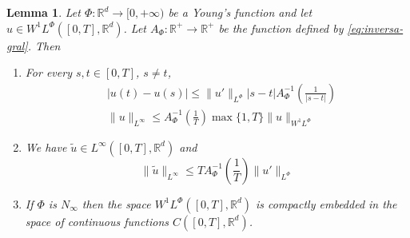 \documentclass[twoside]{article}
\newtheorem{lem}[thm]{Lemma}
\theoremstyle{remark}
\newcommand{\orlnor}{\|_{L^{\Phi}}}
\newcommand{\linf}{\|_{L^{\infty}}}
\newcommand{\lphi}{L^{\Phi}}
\newcommand{\wphi}{W^{1}\lphi}
\newcommand{\sobnor}{\|_{W^{1}\lphi}}
\newcommand{\rr}{\mathbb{R}}
\renewcommand{\leq}{\leqslant}
\begin{document}
\begin{lem}\label{inclusion orlicz} Let $\Phi:\rr^d\to [0,+\infty)$ be a Young's 
function and let $u\in\wphi([0,T],\rr^d)$. Let 
$A_{\Phi}: \rr^+ \to \rr^+$ be the function defined by \eqref{eq:inversa-gral}. Then
\begin{enumerate}
\item\label{inclusion orlicz_item1} For every $s,t\in [0,T]$, $s\neq t$,
\begin{align}
 &|u(t)-u(s)| \leq
 \|u'\orlnor |s-t|A_{\Phi}^{-1}\left(\frac{1}{|s-t|}\right)\tag{Morrey's inequality}\label{in-sob-cont}
\\
& \| u\linf \leq A_\Phi^{-1}\left(\frac{1}{T}\right)\max\{1,T\}\|u\sobnor\tag{Sobolev's inequality}\label{sobolev}
\end{align}
\item We have $\widetilde{u}\in L^{\infty}([0,T],\rr^d)$ and
\[
\|\widetilde u \linf \leq T A_{\Phi}^{-1}\left(\frac{1}{T}\right)\|u'\orlnor
\tag{Sobolev-Wirtinger's inequality}\label{wirtinger}
\]
\item\label{it:embeding} If $\Phi$ is $N_{\infty}$ then the space $\wphi([0,T],\rr^d)$ is compactly embedded in the space of continuous functions $C([0,T],\rr^d)$.
\end{enumerate}
\end{lem}
\end{document}

